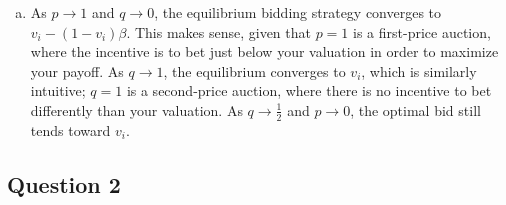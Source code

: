 \documentclass{article}
\begin{document}
\begin{enumerate}[(a)]
	\item As ${p\rightarrow1}$ and ${q\rightarrow0}$, the equilibrium bidding strategy converges to ${v_i-(1-v_i)\beta}$. This makes sense, given that ${p=1}$ is a first-price auction, where the incentive is to bet just below your valuation in order to maximize your payoff. As ${q\rightarrow1}$, the equilibrium converges to $v_i$, which is similarly intuitive; ${q=1}$ is a second-price auction, where there is no incentive to bet differently than your valuation. As ${q\rightarrow\frac{1}{2}}$ and ${p\rightarrow 0}$, the optimal bid still tends toward $v_i$.
	
	
\end{enumerate}




\subsection*{Question 2}
\end{document}
